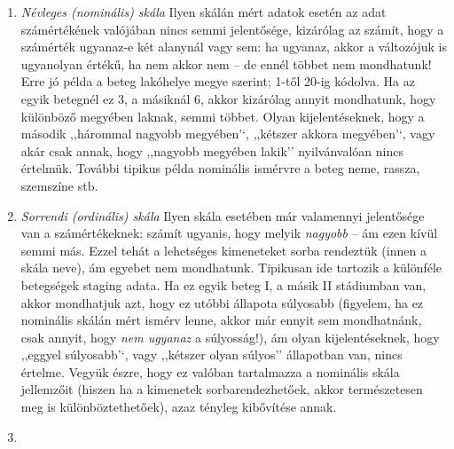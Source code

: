\documentclass[
]{book}
\providecommand{\tightlist}{%
  \setlength{\itemsep}{0pt}\setlength{\parskip}{0pt}}
\begin{document}
\begin{enumerate}
\def\labelenumi{\arabic{enumi}.}
\tightlist
\item
  \emph{Névleges (nominális) skála} Ilyen skálán mért adatok esetén az adat számértékének valójában nincs semmi jelentősége, kizárólag az számít, hogy a számérték ugyanaz-e két alanynál vagy sem: ha ugyanaz, akkor a változójuk is ugyanolyan értékű, ha nem akkor nem -- de ennél többet nem mondhatunk! Erre jó példa a beteg lakóhelye megye szerint; 1-től 20-ig kódolva. Ha az egyik betegnél ez 3, a másiknál 6, akkor kizárólag annyit mondhatunk, hogy különböző megyében laknak, semmi többet. Olyan kijelentéseknek, hogy a második ,,hárommal nagyobb megyében'`, ,,kétszer akkora megyében'`, vagy akár csak annak, hogy ,,nagyobb megyében lakik'' nyilvánvalóan nincs értelmük. További tipikus példa nominális ismérvre a beteg neme, rassza, szemszíne stb.
\item
  \emph{Sorrendi (ordinális) skála} Ilyen skála esetében már valamennyi jelentősége van a számértékeknek: számít ugyanis, hogy melyik \emph{nagyobb} -- ám ezen kívül semmi más. Ezzel tehát a lehetséges kimeneteket sorba rendeztük (innen a skála neve), ám egyebet nem mondhatunk. Tipikusan ide tartozik a különféle betegségek staging adata. Ha ez egyik beteg I, a másik II stádiumban van, akkor mondhatjuk azt, hogy ez utóbbi állapota súlyosabb (figyelem, ha ez nominális skálán mért ismérv lenne, akkor már ennyit sem mondhatnánk, csak annyit, hogy \emph{nem ugyanaz} a súlyosság!), ám olyan kijelentéseknek, hogy ,,eggyel súlyosabb'`, vagy ,,kétszer olyan súlyos'' állapotban van, nincs értelme. Vegyük észre, hogy ez valóban tartalmazza a nominális skála jellemzőit (hiszen ha a kimenetek sorbarendezhetőek, akkor természetesen meg is különböztethetőek), azaz tényleg kibővítése annak.
\item

\end{enumerate}
\end{document}
